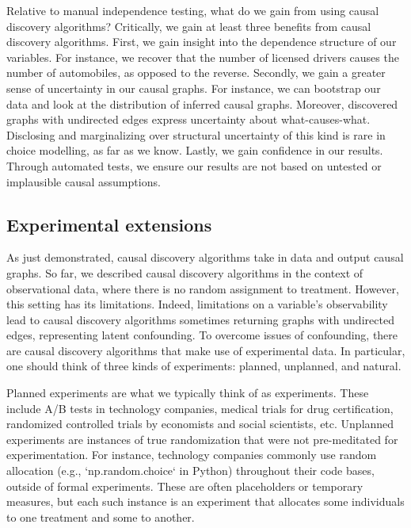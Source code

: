 Relative to manual independence testing, what do we gain from using causal discovery algorithms?
Critically, we gain at least three benefits from causal discovery algorithms.
First, we gain insight into the dependence structure of our variables.
For instance, we recover that the number of licensed drivers causes the number of automobiles, as opposed to the reverse.
Secondly, we gain a greater sense of uncertainty in our causal graphs.
For instance, we can bootstrap our data and look at the distribution of inferred causal graphs.
Moreover, discovered graphs with undirected edges express uncertainty about what-causes-what.
Disclosing and marginalizing over structural uncertainty of this kind is rare in choice modelling, as far as we know.
Lastly, we gain confidence in our results.
Through automated tests, we ensure our results are not based on untested or implausible causal assumptions.

\subsection{Experimental extensions}
\label{sec:experimental-extension}

As just demonstrated, causal discovery algorithms take in data and output causal graphs.
So far, we described causal discovery algorithms in the context of observational data, where there is no random assignment to treatment.
However, this setting has its limitations.
Indeed, limitations on a variable's observability lead to causal discovery algorithms sometimes returning graphs with undirected edges, representing latent confounding.
To overcome issues of confounding, there are causal discovery algorithms that make use of experimental data.
In particular, one should think of three kinds of experiments: planned, unplanned, and natural.

Planned experiments are what we typically think of as experiments.
These include A/B tests in technology companies, medical trials for drug certification, randomized controlled trials by economists and social scientists, etc.
Unplanned experiments are instances of true randomization that were not pre-meditated for experimentation.
For instance, technology companies commonly use random allocation (e.g., `np.random.choice` in Python) throughout their code bases, outside of formal experiments.
These are often placeholders or temporary measures, but each such instance is an experiment that allocates some individuals to one treatment and some to another.

